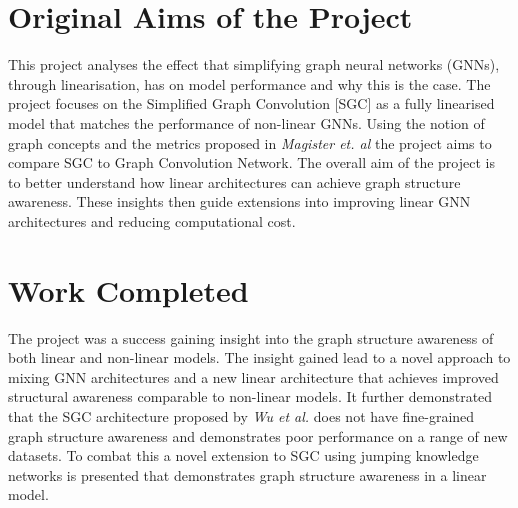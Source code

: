 \documentclass[12pt,a4paper,twoside,openright]{report}
\begin{document}

\section*{Original Aims of the Project}

This project analyses the effect that simplifying graph neural networks (GNNs), through linearisation, has on model performance and why this is the case.
The project focuses
on the Simplified Graph Convolution \cite{wu2019simplifying}[SGC] as a fully linearised model that matches the performance of non-linear GNNs.
Using the notion of graph concepts and the metrics proposed in \textit{Magister et. al} \cite{magister2021gcexplainer} the project aims to compare SGC to Graph Convolution Network.
The overall aim of the project is to better understand how linear architectures can achieve graph structure awareness.
These insights then guide extensions into improving linear GNN architectures and reducing computational cost.

\section*{Work Completed}

The project was a success gaining insight into the graph structure awareness of both linear and non-linear models.
The insight gained lead to a novel approach to mixing GNN architectures and a new linear architecture that achieves improved structural awareness comparable to non-linear models.
It further demonstrated that the SGC architecture proposed by \textit{Wu et al.} does not have fine-grained graph structure awareness and demonstrates poor performance on a range of new datasets.
To combat this a novel extension to SGC using jumping knowledge networks\cite{xu2018representation} is presented that demonstrates graph structure awareness in a linear model.
\end{document}
